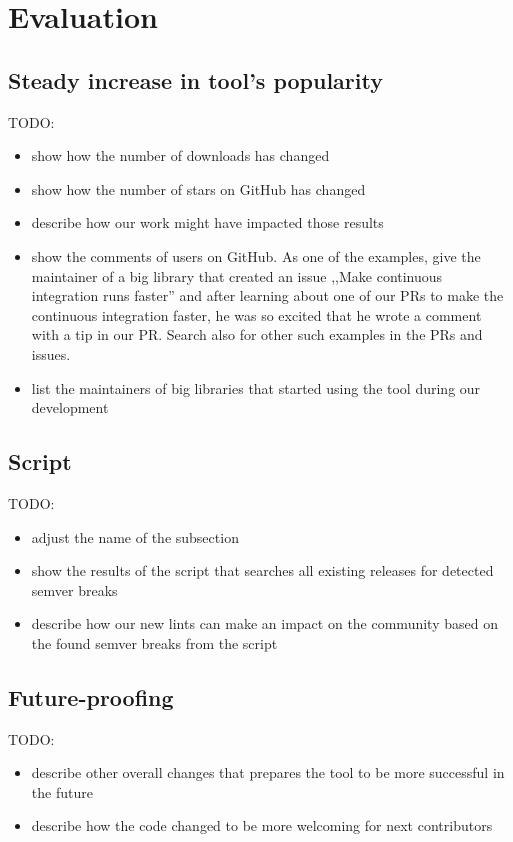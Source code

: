 \documentclass[licencjacka,en]{pracamgr}
\begin{document}
\chapter{Evaluation}\label{r:chapter_evaluation}

\section{Steady increase in tool's popularity}

TODO:
\begin{itemize}
	\item show how the number of downloads has changed
	\item show how the number of stars on GitHub has changed
	\item describe how our work might have impacted those results
	\item show the comments of users on GitHub.
		As one of the examples, give the maintainer of a big
		library that created an issue ,,Make continuous integration runs faster''
		and after learning about one of our PRs to make the continuous integration faster,
		he was so excited that he wrote a comment with a tip in our PR.
		Search also for other such examples in the PRs and issues.
	\item list the maintainers of big libraries that started using the tool during our development
\end{itemize}

\section{Script} \label{r:section_scanning_script}

TODO:
\begin{itemize}
        \item adjust the name of the subsection
        \item show the results of the script that searches all existing releases for detected semver breaks
	\item describe how our new lints can make an impact on the community based on the found semver breaks from the script
\end{itemize}

\section{Future-proofing}

TODO:
\begin{itemize}
	\item describe other overall changes that prepares the tool to be more successful in the future
	\item describe how the code changed to be more welcoming for next contributors
\end{itemize}
\end{document}
